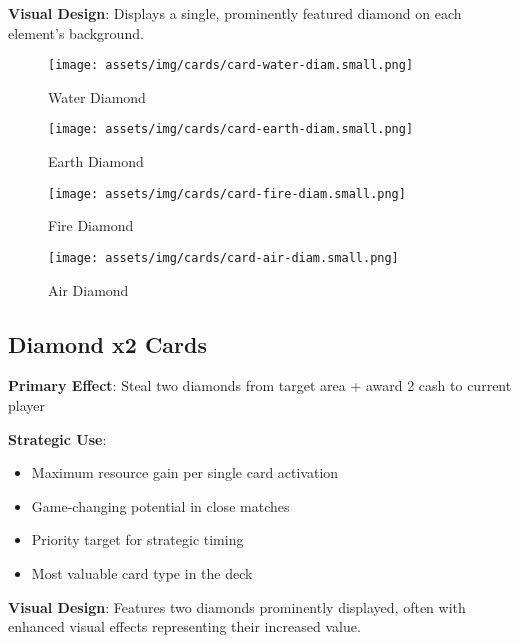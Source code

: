 \documentclass[12pt,a4paper]{article}
\begin{document}
\textbf{Visual Design}: Displays a single, prominently featured diamond on each element's background.

\begin{figure}[h]
\centering
\begin{minipage}{0.2\textwidth}
    \centering
    \texttt{[image: assets/img/cards/card-water-diam.small.png]}
    \caption*{\textcolor{waterblue}{Water Diamond}}
\end{minipage}
\hfill
\begin{minipage}{0.2\textwidth}
    \centering
    \texttt{[image: assets/img/cards/card-earth-diam.small.png]}
    \caption*{\textcolor{earthgreen}{Earth Diamond}}
\end{minipage}
\hfill
\begin{minipage}{0.2\textwidth}
    \centering
    \texttt{[image: assets/img/cards/card-fire-diam.small.png]}
    \caption*{\textcolor{firered}{Fire Diamond}}
\end{minipage}
\hfill
\begin{minipage}{0.2\textwidth}
    \centering
    \texttt{[image: assets/img/cards/card-air-diam.small.png]}
    \caption*{\textcolor{airyellow}{Air Diamond}}
\end{minipage}
\end{figure}

\subsection{Diamond x2 Cards}
\textbf{Primary Effect}: Steal two diamonds from target area + award 2 cash to current player

\textbf{Strategic Use}:
\begin{itemize}
    \item Maximum resource gain per single card activation
    \item Game-changing potential in close matches
    \item Priority target for strategic timing
    \item Most valuable card type in the deck
\end{itemize}

\textbf{Visual Design}: Features two diamonds prominently displayed, often with enhanced visual effects representing their increased value.
\end{document}
